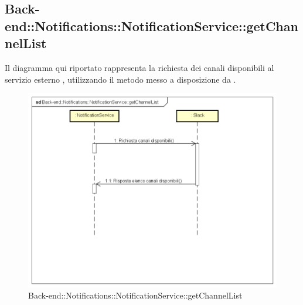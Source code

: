 \subsection{Back-end::Notifications::NotificationService::getChannelList}
Il diagramma qui riportato rappresenta la richiesta dei canali disponibili al servizio esterno , utilizzando il metodo  messo a disposizione da .
 \begin{figure}[h] \centering \includegraphics[width=\textwidth,height=\textheight,keepaspectratio]{images/diagrams/back-end/Ufficial_Backend/Back-endNotificationsNotificationServicegetChannelList.png} 	\caption{Back-end::Notifications::NotificationService::getChannelList}
\end{figure}

